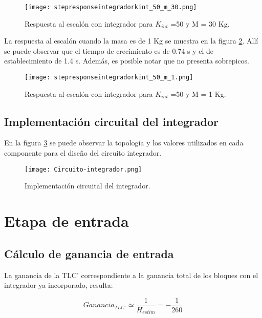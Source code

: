 \begin{figure}[H]
	\centering
	\texttt{[image: stepresponseintegradorkint\_50\_m\_30.png]}
	\caption{Respuesta al escalón con integrador para $K_{int}$ =50 y M = 30 Kg.}
	\label{fig:respuesta-al-escalon-con-k-50-M-30}
\end{figure}

\noindent La respuesta al escal\'{o}n cuando la masa es de 1 Kg se muestra en la figura \ref{fig:respuesta-al-escalon-con-k-50-M-1}. All\'{i} se puede observar que el tiempo de crecimiento es de 0.74 s y el de establecimiento de 1.4 s. Adem\'{a}s, es posible notar que no presenta sobrepicos.

\begin{figure}[H]
	\centering
	\texttt{[image: stepresponseintegradorkint\_50\_m\_1.png]}
	\caption{Respuesta al escalón con integrador para $K_{int}$ =50 y M = 1 Kg.}
	\label{fig:respuesta-al-escalon-con-k-50-M-1}
\end{figure}



\subsection{Implementación circuital del integrador}

\noindent En la figura \ref{fig:circuito-integrador} se puede observar la topología y los valores utilizados en cada componente para el diseño del circuito integrador. 

\begin{figure}[H]
	\centering
	\texttt{[image: Circuito-integrador.png]}
	\caption{Implementación circuital del integrador.}
	\label{fig:circuito-integrador}
	\end{figure}
\section{Etapa de entrada}
\subsection{Cálculo de ganancia de entrada}

\noindent La ganancia de la TLC' correspondiente a la ganancia total de los bloques con el integrador ya incorporado, resulta:

\begin{equation} 
	Ganancia_{TLC'} \simeq \frac{1}{H_{estim}} = - \frac{1}{260}
\end{equation}

